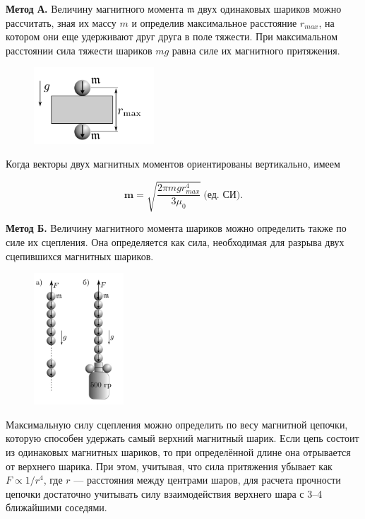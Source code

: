 \documentclass[a4paper, 12pt]{article}
\begin{document}
	\textbf{Метод А.} Величину магнитного момента $\mathfrak{m}$ двух одинаковых шариков можно рассчитать, зная их массу $m$ и определив максимальное расстояние $r_{max}$, на котором они еще удерживают друг друга в поле тяжести. При максимальном расстоянии сила тяжести шариков $mg$ равна силе их магнитного притяжения. 
	
	\begin{figure}
			\includegraphics[width=0.4\textwidth, height = 0.2\textheight]{rmax (1)}
	\end{figure}
	
	Когда векторы двух магнитных моментов ориентированы вертикально, имеем
	
	\begin{equation*}
		\mathbf{m} = \sqrt{\frac{2\pi mgr^4_{max}}{3 \mu_0}} \ \text{(ед. СИ).}
	\end{equation*}
	
	\textbf{Метод Б.} Величину магнитного момента шариков можно определить также по силе их сцепления. Она определяется как сила, необходимая для разрыва двух сцепившихся магнитных шариков. 
	
	\begin{figure}
		\centering
		\includegraphics[width=0.3\textwidth, height = 0.25\textheight]{mmax}
		
	\end{figure}
	
	Максимальную силу сцепления можно определить по весу магнитной цепочки, которую способен удержать самый верхний магнитный шарик. Если цепь состоит из одинаковых магнитных шариков, то при определённой длине она отрывается от верхнего шарика. При этом, учитывая, что сила притяжения убывает как $F \propto 1/r^4$, где $r$ — расстояния между центрами шаров, для расчета прочности цепочки достаточно учитывать силу взаимодействия верхнего шара с 3–4 ближайшими соседями.
	
\end{document}
